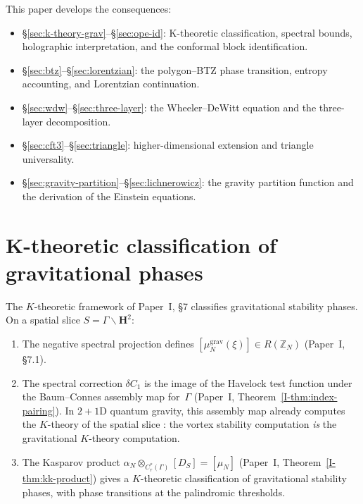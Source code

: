 This paper develops the consequences:
\begin{itemize}
  \item \S\ref{sec:k-theory-grav}--\S\ref{sec:ope-id}:
    K-theoretic classification, spectral bounds, holographic
    interpretation, and the conformal block identification.
  \item \S\ref{sec:btz}--\S\ref{sec:lorentzian}:
    the polygon--BTZ phase transition, entropy accounting,
    and Lorentzian continuation.
  \item \S\ref{sec:wdw}--\S\ref{sec:three-layer}:
    the Wheeler--DeWitt equation and the three-layer decomposition.
  \item \S\ref{sec:cft3}--\S\ref{sec:triangle}:
    higher-dimensional extension and triangle universality.
  \item \S\ref{sec:gravity-partition}--\S\ref{sec:lichnerowicz}:
    the gravity partition function and the derivation of the
    Einstein equations.
\end{itemize}


\section{K-theoretic classification of gravitational phases}

The $K$-theoretic framework of Paper~I, \S7 classifies
gravitational stability phases.
On a spatial slice $S = \Gamma\backslash\mathbf{H}^2$:
\begin{enumerate}
  \item The negative spectral projection defines
    $[\mu_N^{\mathrm{grav}}(\xi)] \in R(\mathbb{Z}_N)$
    (Paper~I, \S7.1).
  \item The spectral correction $\delta C_1$ is the image of
    the Havelock test function under the Baum--Connes assembly
    map for~$\Gamma$ (Paper~I, Theorem~\ref{I-thm:index-pairing}).
    In $2{+}1$D quantum gravity, this assembly map already
    computes the $K$-theory of the spatial slice
    \citep{Carlip1998}: the vortex stability computation
    \emph{is} the gravitational $K$-theory computation.
  \item The Kasparov product
    $\alpha_N \otimes_{C^*_r(\Gamma)} [D_S] = [\mu_N]$
    (Paper~I, Theorem~\ref{I-thm:kk-product})
    gives a $K$-theoretic classification of gravitational
    stability phases, with phase transitions at the
    palindromic thresholds.
\end{enumerate}

